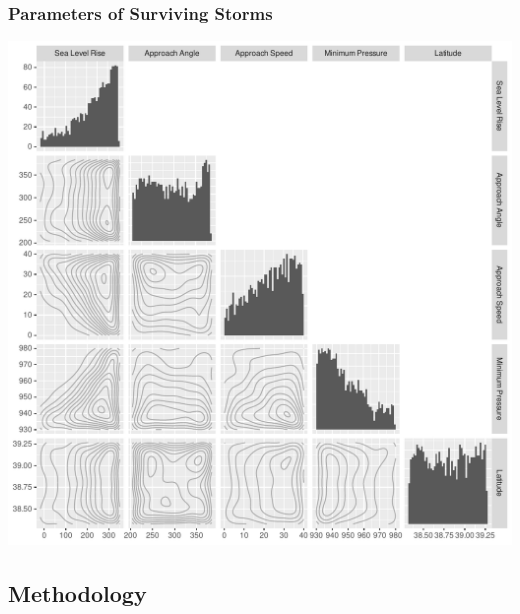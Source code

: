 \documentclass[aspectratio=169,10pt,notes]{beamer}
\newlength{\frametextheight}
\begin{document}
\begin{frame}
    \frametitle{Parameters of Surviving Storms}
    \begin{center}
        \includegraphics[height=0.99\frametextheight]{./ch3/plots/threshold_pairs}
    \end{center}
\end{frame} %

\note{
    \begin{itemize}
        \item
    \end{itemize}
}

\subsection{Methodology}
\end{document}
